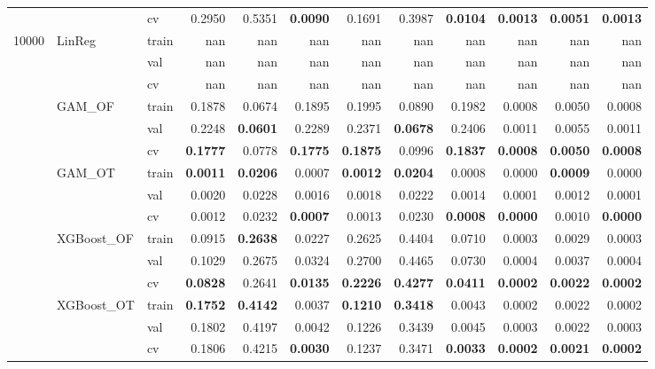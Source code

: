 \begin{tabular}{lllrrrrrrrrr}
 &  & cv & 0.2950 & 0.5351 & \bfseries 0.0090 & 0.1691 & 0.3987 & \bfseries 0.0104 & \bfseries 0.0013 & \bfseries 0.0051 & \bfseries 0.0013 \\
\multirow[c]{15}{*}{10000} & \multirow[c]{3}{*}{LinReg} & train & nan & nan & nan & nan & nan & nan & nan & nan & nan \\
 &  & val & nan & nan & nan & nan & nan & nan & nan & nan & nan \\
 &  & cv & nan & nan & nan & nan & nan & nan & nan & nan & nan \\
 & \multirow[c]{3}{*}{GAM_OF} & train & 0.1878 & 0.0674 & 0.1895 & 0.1995 & 0.0890 & 0.1982 & 0.0008 & 0.0050 & 0.0008 \\
 &  & val & 0.2248 & \bfseries 0.0601 & 0.2289 & 0.2371 & \bfseries 0.0678 & 0.2406 & 0.0011 & 0.0055 & 0.0011 \\
 &  & cv & \bfseries 0.1777 & 0.0778 & \bfseries 0.1775 & \bfseries 0.1875 & 0.0996 & \bfseries 0.1837 & \bfseries 0.0008 & \bfseries 0.0050 & \bfseries 0.0008 \\
 & \multirow[c]{3}{*}{GAM_OT} & train & \bfseries 0.0011 & \bfseries 0.0206 & 0.0007 & \bfseries 0.0012 & \bfseries 0.0204 & 0.0008 & 0.0000 & \bfseries 0.0009 & 0.0000 \\
 &  & val & 0.0020 & 0.0228 & 0.0016 & 0.0018 & 0.0222 & 0.0014 & 0.0001 & 0.0012 & 0.0001 \\
 &  & cv & 0.0012 & 0.0232 & \bfseries 0.0007 & 0.0013 & 0.0230 & \bfseries 0.0008 & \bfseries 0.0000 & 0.0010 & \bfseries 0.0000 \\
 & \multirow[c]{3}{*}{XGBoost_OF} & train & 0.0915 & \bfseries 0.2638 & 0.0227 & 0.2625 & 0.4404 & 0.0710 & 0.0003 & 0.0029 & 0.0003 \\
 &  & val & 0.1029 & 0.2675 & 0.0324 & 0.2700 & 0.4465 & 0.0730 & 0.0004 & 0.0037 & 0.0004 \\
 &  & cv & \bfseries 0.0828 & 0.2641 & \bfseries 0.0135 & \bfseries 0.2226 & \bfseries 0.4277 & \bfseries 0.0411 & \bfseries 0.0002 & \bfseries 0.0022 & \bfseries 0.0002 \\
 & \multirow[c]{3}{*}{XGBoost_OT} & train & \bfseries 0.1752 & \bfseries 0.4142 & 0.0037 & \bfseries 0.1210 & \bfseries 0.3418 & 0.0043 & 0.0002 & 0.0022 & 0.0002 \\
 &  & val & 0.1802 & 0.4197 & 0.0042 & 0.1226 & 0.3439 & 0.0045 & 0.0003 & 0.0022 & 0.0003 \\
 &  & cv & 0.1806 & 0.4215 & \bfseries 0.0030 & 0.1237 & 0.3471 & \bfseries 0.0033 & \bfseries 0.0002 & \bfseries 0.0021 & \bfseries 0.0002 \\
\end{tabular}

